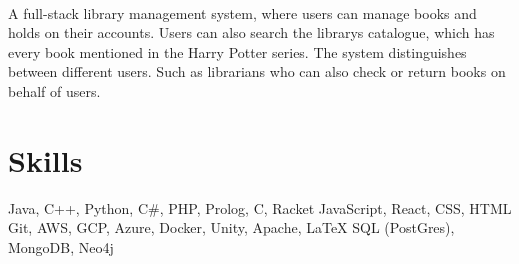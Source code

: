\documentclass[]{resume-openfont}
\begin{document}
\\
A full-stack library management system, where users can manage books and holds on their accounts. Users can also search the library\textquotesingle{}s catalogue, which has every book mentioned in the Harry Potter series. The system distinguishes between different users. Such as librarians who can also check or return books on behalf of users.\\
\sectionsep
%
%
\section{Skills}

\begin{resumeSkillList}
    \small{\item{
    Java, C++, Python, C\#, PHP, Prolog, C, Racket
    \hspace*{\fill} 
    JavaScript, React, CSS, HTML
    \\
    Git, AWS, GCP, Azure, Docker, Unity, Apache, \LaTeX
    \hspace*{\fill} 
    SQL (PostGres), MongoDB, Neo4j
    }}
\end{resumeSkillList}
\end{document}
